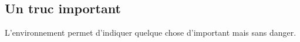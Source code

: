 \documentclass[12pt, a4paper]{article}
\begin{document}
\subsection{Un truc important}

L'environnement  permet d'indiquer quelque chose d'important mais sans danger.

\end{document}

